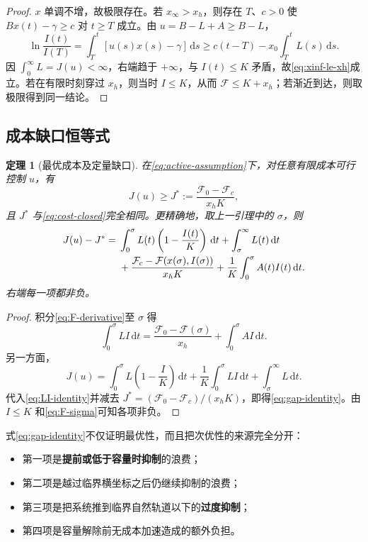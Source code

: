 \documentclass[11pt,a4paper,UTF8]{ctexart}
\newtheorem{theorem}{定理}[section]
\theoremstyle{definition}
\newcommand{\Fcal}{\mathcal{F}}
\newcommand{\dd}{\,\mathrm{d}}
\begin{document}
\begin{proof}
$x$ 单调不增，故极限存在。若 $x_\infty>x_h$，则存在 $T$、$c>0$ 使 $Bx(t)-\gamma\ge c$ 对 $t\ge T$ 成立。由 $u=B-L+A\ge B-L$，
\[
\ln\frac{I(t)}{I(T)}
=\int_T^t[u(s)x(s)-\gamma]\dd s
\ge c(t-T)-x_0\int_T^tL(s)\dd s.
\]
因 $\int_0^\infty L=J(u)<\infty$，右端趋于 $+\infty$，与 $I(t)\le K$ 矛盾，故\eqref{eq:xinf-le-xh}成立。若在有限时刻穿过 $x_h$，则当时 $I\le K$，从而
$\Fcal\le K+x_h$；若渐近到达，则取极限得到同一结论。
\end{proof}

\subsection{成本缺口恒等式}

\begin{theorem}[最优成本及定量缺口]
在\eqref{eq:active-assumption}下，对任意有限成本可行控制 $u$，有
\begin{equation}
J(u)\ge J^*:=\frac{\Fcal_0-\Fcal_c}{x_hK},
\label{eq:lower-bound-J}
\end{equation}
且 $J^*$ 与\eqref{eq:cost-closed}完全相同。更精确地，取上一引理中的 $\sigma$，则
\begin{align}
J(u)-J^*
={}&\int_0^\sigma L(t)\left(1-\frac{I(t)}K\right)\dd t
+\int_\sigma^\infty L(t)\dd t
\notag\\
&+\frac{\Fcal_c-\Fcal(x(\sigma),I(\sigma))}{x_hK}
+\frac1K\int_0^\sigma A(t)I(t)\dd t.
\label{eq:gap-identity}
\end{align}
右端每一项都非负。
\end{theorem}

\begin{proof}
积分\eqref{eq:F-derivative}至 $\sigma$ 得
\begin{equation}
\int_0^\sigma L I\dd t
=\frac{\Fcal_0-\Fcal(\sigma)}{x_h}
+\int_0^\sigma A I\dd t.
\label{eq:LI-identity}
\end{equation}
另一方面，
\[
J(u)=\int_0^\sigma L\left(1-\frac IK\right)\dd t
+\frac1K\int_0^\sigma LI\dd t
+\int_\sigma^\infty L\dd t.
\]
代入\eqref{eq:LI-identity}并减去
$J^*=(\Fcal_0-\Fcal_c)/(x_hK)$，即得\eqref{eq:gap-identity}。由 $I\le K$ 和\eqref{eq:F-sigma}可知各项非负。
\end{proof}

式\eqref{eq:gap-identity}不仅证明最优性，而且把次优性的来源完全分开：
\begin{itemize}[leftmargin=2.2em]
\item 第一项是\textbf{提前或低于容量时抑制}的浪费；
\item 第二项是越过临界横坐标之后仍继续抑制的浪费；
\item 第三项是把系统推到临界自然轨道以下的\textbf{过度抑制}；
\item 第四项是容量解除前无成本加速造成的额外负担。
\end{itemize}
\end{document}
